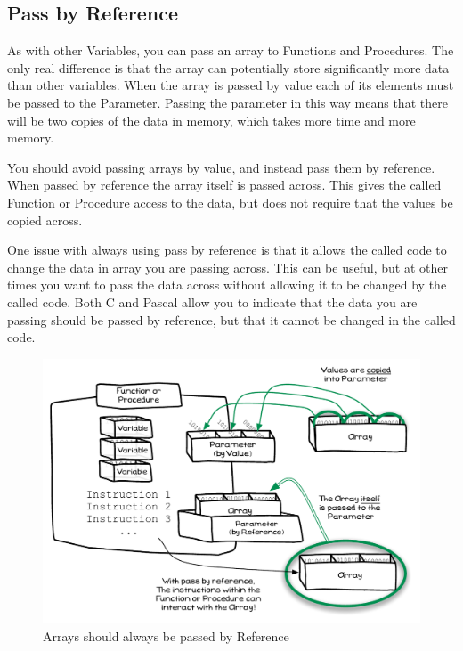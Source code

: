 \clearpage
\subsection{Pass by Reference} %
\label{sub:pass_by_reference}

As with other Variables, you can pass an array to Functions and Procedures. The only real difference is that the array can potentially store significantly more data than other variables. When the array is passed by value each of its elements must be passed to the Parameter. Passing the parameter in this way means that there will be two copies of the data in memory, which takes more time and more memory.

You should avoid passing arrays by value, and instead pass them by reference. When passed by reference the array itself is passed across. This gives the called Function or Procedure access to the data, but does not require that the values be copied across.

One issue with always using pass by reference is that it allows the called code to change the data in array you are passing across. This can be useful, but at other times you want to pass the data across without allowing it to be changed by the called code. Both C and Pascal allow you to indicate that the data you are passing should be passed by reference, but that it cannot be changed in the called code.

\begin{figure}[h]
   \centering
   \includegraphics[width=\textwidth]{./topics/arrays/diagrams/ByRefByVal} 
   \caption{Arrays should always be passed by Reference}
   \label{fig:array-by-ref-by-val}
\end{figure}



